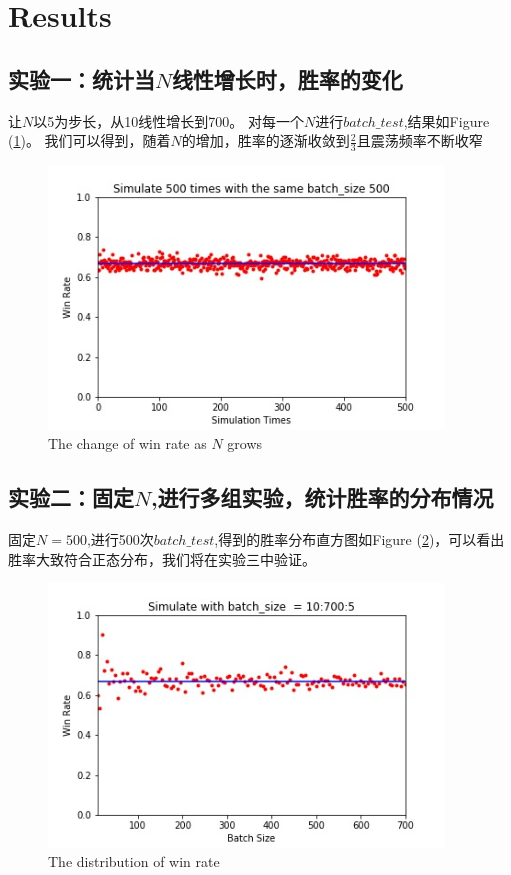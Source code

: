 \documentclass[12pt]{article}
\begin{document}
\section{Results}
\subsection{实验一：统计当$N$线性增长时，胜率的变化}
让$N$以5为步长，从10线性增长到700。
对每一个$N$进行$batch\_test$,结果如Figure (\ref{fig 1})。
我们可以得到，随着$N$的增加，胜率的逐渐收敛到$\frac{2}{3}$且震荡频率不断收窄

\begin{figure}[H]
  \centering
  \includegraphics[height = 7cm]{fig3.jpg}
  \caption{The change of win rate as $N$ grows}
  \label{fig 1}
\end{figure}


\subsection{实验二：固定$N$,进行多组实验，统计胜率的分布情况}
固定$N = 500$,进行500次$batch\_test$,得到的胜率分布直方图如Figure (\ref{fig 2})，可以看出胜率大致符合正态分布，我们将在实验三中验证。
\begin{figure}[H]
  \centering
  \includegraphics[height = 7cm]{fig2.jpg}
  \caption{The distribution of win rate}
  \label{fig 2}
\end{figure}
\end{document}

